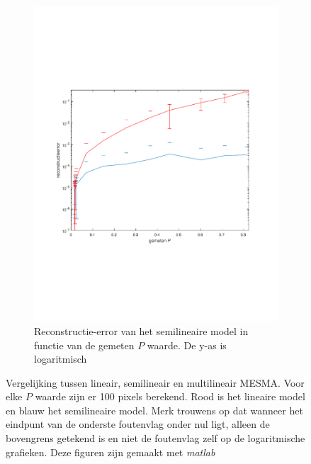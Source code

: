 \documentclass[12pt]{report}
\begin{document}
\begin{figure}
\begin{subfigure}[b]{0.5\textwidth}
\includegraphics[width=\textwidth,trim=0 200 0 175 cm]{PMC_AAM_10_100_EPlog.pdf}
\caption{Reconstructie-error van het semilineaire model in functie van de gemeten $P$ waarde. De y-as is logaritmisch \label{fig:AEPlog} }
\end{subfigure}
\caption{Vergelijking tussen lineair, semilineair en multilineair MESMA. Voor elke $P$ waarde zijn er 100 pixels berekend. Rood is het lineaire model en blauw het semilineaire model. Merk trouwens op dat wanneer het eindpunt van de onderste foutenvlag onder nul ligt, alleen de bovengrens getekend is en niet de foutenvlag zelf op de logaritmische grafieken. Deze figuren zijn gemaakt met \textit{matlab}\cite{matlab}\label{fig:Ae100}}
\end{figure}
\end{document}
